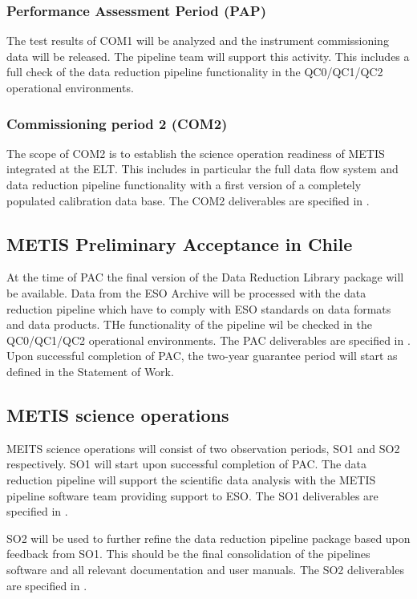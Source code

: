 \subsubsection{Performance Assessment Period (PAP)}
\label{ssec:pap}

The test results of COM1 will be analyzed and the instrument commissioning data will be released. The pipeline team will support this activity. This includes a full check of the data reduction pipeline functionality in the QC0/QC1/QC2 operational environments.

\subsubsection{Commissioning period 2 (COM2)}
\label{ssec:com2}

The scope of COM2 is to establish the science operation readiness of METIS integrated at the ELT. This includes in particular the full data flow system and data reduction pipeline functionality with a first version of a completely populated calibration data base. The COM2 deliverables are specified in \cite{1618}.

\subsection{METIS Preliminary Acceptance in Chile}
\label{ssec:pae_chile}

At the time of PAC the final version of the Data Reduction Library package will be available. Data from the ESO Archive will be processed with the data reduction pipeline  which have to comply with ESO standards on data formats and data products. THe functionality of the pipeline wil be checked in the QC0/QC1/QC2 operational environments. The PAC deliverables are specified in \cite{1618}. Upon successful completion of PAC, the two-year guarantee period will start as defined in the Statement of Work.

\subsection{METIS science operations}
\label{ssec:sciops}

MEITS science operations will consist of two observation periods, SO1 and SO2 respectively. SO1 will start upon successful completion of PAC. The data reduction pipeline will support the scientific data analysis with the METIS pipeline software team providing support to ESO. The SO1 deliverables are specified in \cite{1618}.

SO2 will be used to further refine the data reduction pipeline package based upon feedback from SO1. This should be the final consolidation of the pipelines software and all relevant documentation and user manuals. The SO2 deliverables are specified in \cite{1618}.

